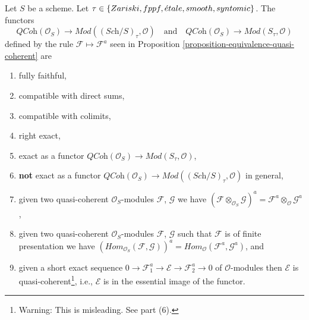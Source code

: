 \begin{lemma}
\label{lemma-equivalence-quasi-coherent-limits}
Let $S$ be a scheme.
Let $\tau \in \{Zariski,\linebreak[0] fppf,\linebreak[0]
\acute{e}tale,\linebreak[0] smooth,\linebreak[0] syntomic\}$.
The functors
$$
\textit{QCoh}(\mathcal{O}_S)
\longrightarrow 
\textit{Mod}((\textit{Sch}/S)_\tau, \mathcal{O})
\quad\text{and}\quad
\textit{QCoh}(\mathcal{O}_S)
\longrightarrow 
\textit{Mod}(S_\tau, \mathcal{O})
$$
defined by the rule $\mathcal{F} \mapsto \mathcal{F}^a$ seen in
Proposition \ref{proposition-equivalence-quasi-coherent}
are
\begin{enumerate}
\item fully faithful,
\item compatible with direct sums,
\item compatible with colimits,
\item right exact,
\item exact as a functor
$\textit{QCoh}(\mathcal{O}_S) \to \textit{Mod}(S_\tau, \mathcal{O})$,
\item {\bf not} exact as a functor
$\textit{QCoh}(\mathcal{O}_S) \to
\textit{Mod}((\textit{Sch}/S)_\tau, \mathcal{O})$
in general,
\item given two quasi-coherent $\mathcal{O}_S$-modules
$\mathcal{F}$, $\mathcal{G}$ we have
$(\mathcal{F} \otimes_{\mathcal{O}_S} \mathcal{G})^a = 
\mathcal{F}^a \otimes_\mathcal{O} \mathcal{G}^a$,
\item given two quasi-coherent $\mathcal{O}_S$-modules
$\mathcal{F}$, $\mathcal{G}$ such that $\mathcal{F}$
is of finite presentation we have
$(\textit{Hom}_{\mathcal{O}_S}(\mathcal{F}, \mathcal{G}))^a =
\textit{Hom}_{\mathcal{O}}(\mathcal{F}^a, \mathcal{G}^a)$, and
\item given a short exact sequence
$0 \to \mathcal{F}_1^a \to \mathcal{E} \to \mathcal{F}_2^a \to 0$
of $\mathcal{O}$-modules then $\mathcal{E}$ is
quasi-coherent\footnote{Warning: This is misleading. See part (6).}, i.e.,
$\mathcal{E}$ is in the essential image of the functor.
\end{enumerate}
\end{lemma}

